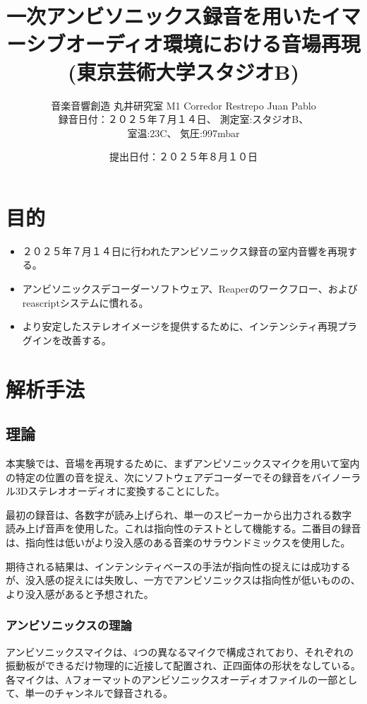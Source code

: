 \documentclass[a4paper, 12pt]{article}
\title{一次アンビソニックス録音を用いたイマーシブオーディオ環境における音場再現 (東京芸術大学スタジオB)}
\author{音楽音響創造 丸井研究室 M1 Corredor Restrepo Juan Pablo \\
録音日付：２０２５年７月１４日、 測定室:スタジオB、 \\
室温:23C、 気圧:997mbar}
\date{提出日付：２０２５年８月１０日}
\begin{document}
\maketitle

\section{目的}
\begin{itemize}
    \item ２０２５年７月１４日に行われたアンビソニックス録音の室内音響を再現する。
    \item アンビソニックスデコーダーソフトウェア、Reaperのワークフロー、およびreascriptシステムに慣れる。
    \item より安定したステレオイメージを提供するために、インテンシティ再現プラグインを改善する。
\end{itemize} 

\section{解析手法}

\subsection{理論}

本実験では、音場を再現するために、まずアンビソニックスマイクを用いて室内の特定の位置の音を捉え、次にソフトウェアデコーダーでその録音をバイノーラル3Dステレオオーディオに変換することにした。

最初の録音は、各数字が読み上げられ、単一のスピーカーから出力される数字読み上げ音声を使用した。これは指向性のテストとして機能する。二番目の録音は、指向性は低いがより没入感のある音楽のサラウンドミックスを使用した。

期待される結果は、インテンシティベースの手法が指向性の捉えには成功するが、没入感の捉えには失敗し、一方でアンビソニックスは指向性が低いものの、より没入感があると予想された。

\subsubsection{アンビソニックスの理論}

アンビソニックスマイクは、4つの異なるマイクで構成されており、それぞれの振動板ができるだけ物理的に近接して配置され、正四面体の形状をなしている。各マイクは、Aフォーマットのアンビソニックスオーディオファイルの一部として、単一のチャンネルで録音される。\cite{nachbar2011ambix}
\end{document}
